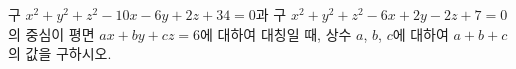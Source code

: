 구 $x^2+y^2+z^2-10x-6y+2z+34=0$과 구 $x^2+y^2+z^2-6x+2y-2z+7=0$의 중심이 평면 $ax+by+cz=6$에 대하여 대칭일 때, 상수 $a$, $b$, $c$에 대하여 $a+b+c$의 값을 구하시오.

